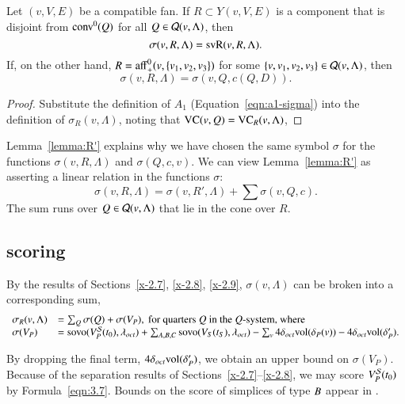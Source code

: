 \begin{lemma}
Let $(v,V,E)$ be a compatible fan.  If $R\subset Y(v,V,E)$
is a component that is disjoint from ${\operatorname{conv}}^0(Q)$ for all 
$Q\in{\mathcal Q}(v,\Lambda)$, then
   $$
   \sigma(v,R,\Lambda) = {\operatorname{svR}}(v,R,\Lambda).
   $$
If, on the other hand, $R = {\operatorname{aff}}_+^0(v,\{v_1,v_2,v_3\})$ for
some $\{v,v_1,v_2,v_3\}\in{\mathcal Q}(v,\Lambda)$, then
   $$  
   \sigma(v,R,\Lambda) =  \sigma(v,Q,c(Q,D)).
   $$
\end{lemma}

\begin{proof} Substitute the definition of $A_1$
(Equation~\ref{eqn:a1-sigma}) into the definition of
$\sigma_R(v,\Lambda)$, noting that ${\operatorname{VC}}(v,Q) 
= {\operatorname{VC}}_{R}(v,\Lambda)$,
\end{proof}

\begin{remark}   Lemma~\ref{lemma:R'} explains why we have chosen
the same symbol $\sigma$ for the functions $\sigma(v,R,\Lambda)$ and
$\sigma(Q,c,v)$.  We can view Lemma~\ref{lemma:R'} as asserting a
linear relation in the functions $\sigma$:
   $$\sigma(v,R,\Lambda) = \sigma(v,R',\Lambda) + \sum \sigma(v,Q,c).$$
The sum runs over $Q\in{\mathcal Q}(v,\Lambda)$ that lie in the cone over $R$.
\end{remark}

\subsection{scoring}

By the results of Sections~\ref{x-2.7}, \ref{x-2.8}, \ref{x-2.9},
$\sigma(v,\Lambda)$ can be broken into a corresponding sum,
    $$
    \begin{array}{lll}
    \sigma_R(v,\Lambda) &= \sum_Q \sigma(Q) + \sigma(V_P),
                \hbox{ for quarters $Q$ in the $Q$-system, where}\\
    \sigma(V_P) &= {\operatorname{sovo}}(V^{{\mathcal S}}_P(t_0),\lambda_{oct})+  \sum_{A,B,C} {\operatorname{sovo}}(V_S(t_S),\lambda_{oct})
        - \sum_v 4\delta_{oct}{\operatorname{vol}}(\delta_P(v)) - 4\delta_{oct}{\operatorname{vol}}(\delta'_P).\\
    \end{array}
    $$

By dropping the final term, $4\delta_{oct}{\operatorname{vol}}(\delta'_P)$, we obtain
an upper bound on $\sigma(V_P)$.  Because of the separation
results of Sections~\ref{x-2.7}--\ref{x-2.8},  we may score
$V^{{\mathcal S}}_P(t_0)$ by Formula~\ref{eqn:3.7}. Bounds on the score of
simplices of type $B$ appear in .



